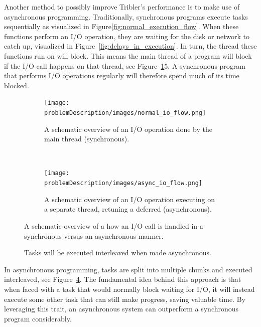 Another method to possibly improve Tribler's performance is to make use of asynchronous programming.
Traditionally, synchronous programs execute tasks sequentially as visualized in Figure\ref{fig:normal_execution_flow}.
When these functions perform an I/O operation, they are waiting for the disk or network to catch up, visualized in Figure~\ref{fig:delays_in_execution}.
In turn, the thread these functions run on will block.
This means the main thread of a program will block if the I/O call happens on that thread, see Figure~\ref{fig:normal_io_flow}5.
A synchronous program that performs I/O operations regularly will therefore spend much of its time blocked.

\begin{figure}[h]
	\centering
	\begin{subfigure}[b]{\textwidth}
		\texttt{[image: problemDescription/images/normal\_io\_flow.png]}
		\caption{A schematic overview of an I/O operation done by the main thread (synchronous).}
		\label{fig:normal_io_flow}
	\end{subfigure}
	~ %
	\begin{subfigure}[b]{\textwidth}
		\texttt{[image: problemDescription/images/async\_io\_flow.png]}
		\caption{A schematic overview of an I/O operation executing on a separate thread, retuning a deferred (asynchronous).}
		\label{fig:async_io_flow}
	\end{subfigure}
	\caption{A schematic overview of a how an I/O call is handled in a synchronous versus an asynchronous manner.}
\end{figure}

\begin{figure}[h]
	\caption{Tasks will be executed interleaved when made asynchronous.}
	\label{fig:async_execution}
\end{figure}

In asynchronous programming, tasks are split into multiple chunks and executed interleaved, see Figure~\ref{fig:async_execution}.
The fundamental idea behind this approach is that when faced with a task that would normally block waiting for I/O, it will instead execute some other task that can still make progress, saving valuable time.
By leveraging this trait, an asynchronous system can outperform a synchronous program considerably.

